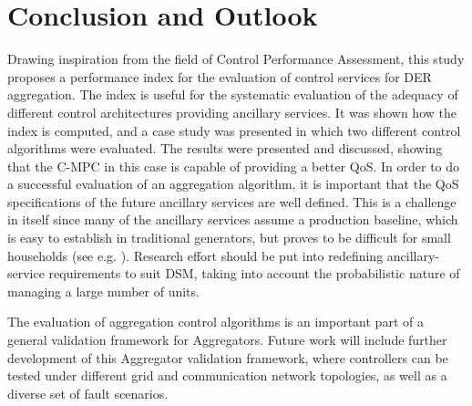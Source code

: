 	\section{Conclusion and Outlook}
	\label{sec:conclusion}
	Drawing inspiration from the field of Control Performance Assessment, this study proposes a performance index for the evaluation of control services for DER aggregation. The index is useful for the systematic evaluation of the adequacy of different control architectures providing ancillary services.
It was shown how the index is computed, and a case study was presented in which two different control algorithms were evaluated. The results were presented and discussed, showing that the C-MPC in this case is capable of providing a better QoS.
	In order to do a successful evaluation of an aggregation algorithm, it is important that the QoS specifications of the future ancillary services are well defined. This is a challenge in itself since many of the ancillary services assume a production baseline, which is easy to establish in traditional generators, but proves to be difficult for small households (see e.g. \cite{Borenstein}). Research effort should be put into redefining ancillary-service requirements to suit DSM, taking into account the probabilistic nature of managing a large number of units.

 The evaluation of aggregation control algorithms is an important part of a general validation framework for Aggregators. Future work will include further development of this Aggregator validation framework, where controllers can be tested under different grid and communication network topologies, as well as a diverse set of fault scenarios.
